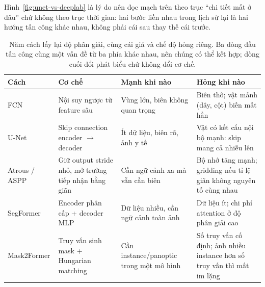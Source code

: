 \documentclass[../../../deep_learning.tex]{subfiles}
\begin{document}
Hình~\ref{fig:unet-vs-deeplab} là lý do nên đọc mạch trên theo trục ``chi tiết mất ở đâu'' chứ không theo trục thời gian: hai bước liền nhau trong lịch sử lại là hai hướng tấn công khác nhau, không phải cái sau thay thế cái trước.

\begin{table}[H]\centering\small
\caption{Năm cách lấy lại độ phân giải, cùng cái giá và chế độ hỏng riêng. Ba dòng đầu tấn công cùng một vấn đề từ ba phía khác nhau, nên chúng có thể kết hợp; dòng cuối đổi phát biểu chứ không đổi cơ chế.}
\label{tab:seg-approaches}
\begin{tabularx}{\linewidth}{@{}L{2.25cm}YYL{3.45cm}@{}}
\toprule
\textbf{Cách} & \textbf{Cơ chế} & \textbf{Mạnh khi nào} & \textbf{Hỏng khi nào}\\
\midrule
FCN & Nội suy ngược từ feature sâu & Vùng lớn, biên không quan trọng & Biên thô; vật mảnh (dây, cột) biến mất hẳn\\
U-Net & Skip connection encoder \(\rightarrow\) decoder & Ít dữ liệu, biên rõ, ảnh y tế & Vật có kết cấu nội bộ mạnh: skip mang cả nhiễu lên\\
Atrous / ASPP & Giữ output stride nhỏ, mở trường tiếp nhận bằng giãn & Cần ngữ cảnh xa mà vẫn cần biên & Bộ nhớ tăng mạnh; gridding nếu tỉ lệ giãn không nguyên tố cùng nhau\\
SegFormer & Encoder phân cấp + decoder MLP & Dữ liệu nhiều, cần ngữ cảnh toàn ảnh & Dữ liệu ít; chi phí attention ở độ phân giải cao\\
Mask2Former & Truy vấn sinh mask + Hungarian matching & Cần instance/panoptic trong một mô hình & Số truy vấn cố định; ảnh nhiều instance hơn số truy vấn thì mất im lặng\\
\bottomrule
\end{tabularx}
\end{table}
\end{document}
